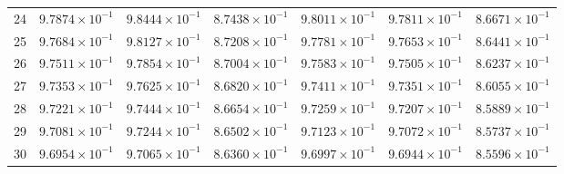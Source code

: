 \begin{table}[H]
\begin{tabular}{@{}rrrrrrr@{}}
24 & $9.7874\times10^{-1}$ & $9.8444\times10^{-1}$ & $8.7438\times10^{-1}$ & $9.8011\times10^{-1}$ & $9.7811\times10^{-1}$ & $8.6671\times10^{-1}$\\
25 & $9.7684\times10^{-1}$ & $9.8127\times10^{-1}$ & $8.7208\times10^{-1}$ & $9.7781\times10^{-1}$ & $9.7653\times10^{-1}$ & $8.6441\times10^{-1}$\\
26 & $9.7511\times10^{-1}$ & $9.7854\times10^{-1}$ & $8.7004\times10^{-1}$ & $9.7583\times10^{-1}$ & $9.7505\times10^{-1}$ & $8.6237\times10^{-1}$\\
27 & $9.7353\times10^{-1}$ & $9.7625\times10^{-1}$ & $8.6820\times10^{-1}$ & $9.7411\times10^{-1}$ & $9.7351\times10^{-1}$ & $8.6055\times10^{-1}$\\
28 & $9.7221\times10^{-1}$ & $9.7444\times10^{-1}$ & $8.6654\times10^{-1}$ & $9.7259\times10^{-1}$ & $9.7207\times10^{-1}$ & $8.5889\times10^{-1}$\\
29 & $9.7081\times10^{-1}$ & $9.7244\times10^{-1}$ & $8.6502\times10^{-1}$ & $9.7123\times10^{-1}$ & $9.7072\times10^{-1}$ & $8.5737\times10^{-1}$\\
30 & $9.6954\times10^{-1}$ & $9.7065\times10^{-1}$ & $8.6360\times10^{-1}$ & $9.6997\times10^{-1}$ & $9.6944\times10^{-1}$ & $8.5596\times10^{-1}$\\
\bottomrule
\end{tabular}
\end{table}

